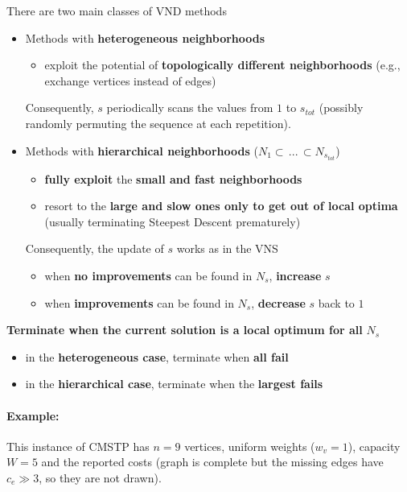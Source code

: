 \documentclass[11pt]{article}
\begin{document}
	There are two main classes of VND methods
	\begin{itemize}
		\item Methods with \textbf{heterogeneous neighborhoods}
		\begin{itemize}
			\item exploit the potential of \textbf{topologically different neighborhoods} (e.g., exchange vertices instead of edges)
		\end{itemize}
		Consequently, $s$ periodically scans the values from $1$ to $s_{tot}$ (possibly randomly permuting the sequence at each repetition).\\
		
		\item Methods with \textbf{hierarchical neighborhoods} ($N_1 \subset \, ... \, \subset N_{s_{tot}}$)
		\begin{itemize}
			\item \textbf{fully exploit} the \textbf{small and fast neighborhoods}
			\item resort to the \textbf{large and slow ones only to get out of local optima} (usually terminating Steepest Descent prematurely)
		\end{itemize}
		Consequently, the update of $s$ works as in the VNS
		\begin{itemize}
			\item when \textbf{no improvements} can be found in $N_s$, \textbf{increase} $s$
			\item when \textbf{improvements} can be found in $N_s$, \textbf{decrease} $s$ back to $1$
		\end{itemize}
	\end{itemize}
	
	\textbf{Terminate when the current solution is a local optimum for all} $N_s$
	\begin{itemize}
		\item in the \textbf{heterogeneous case}, terminate when \textbf{all fail}
		\item in the \textbf{hierarchical case}, terminate when the \textbf{largest fails}
	\end{itemize}
	
	\newpage
	
	\paragraph{Example:} This instance of CMSTP has $n = 9$ vertices, uniform weights ($w_v = 1$), capacity $W = 5$ and the reported costs (graph is complete but the missing edges have $c_e \gg 3$, so they are not drawn).
	
\end{document}
